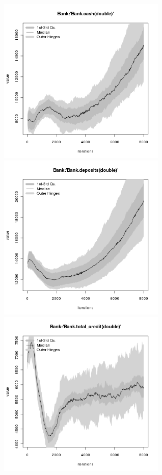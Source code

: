 \begin{figure}[H!]
\centering\leavevmode
\begin{minipage}{17cm}
\centering\leavevmode
\includegraphics[width=8cm]{./benchmark_plots/Bank-cash.png}
\includegraphics[width=8cm]{./benchmark_plots/Bank-deposits.png}\\
\includegraphics[width=8cm]{./benchmark_plots/Bank-total_credit.png}

\end{minipage}
\end{figure}
